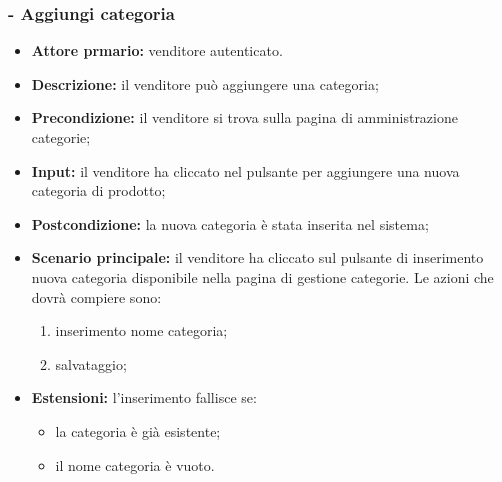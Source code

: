 \stepsubUserCase
\subsubsection{- Aggiungi categoria}
\begin{itemize}
    \item \textbf{Attore prmario:} venditore autenticato.
    \item \textbf{Descrizione:} il venditore può aggiungere una categoria;
    \item \textbf{Precondizione:} il venditore si trova sulla pagina di amministrazione categorie;
    \item \textbf{Input:} il venditore ha cliccato nel pulsante per aggiungere una nuova categoria di prodotto;
    \item \textbf{Postcondizione:} la nuova categoria è stata inserita nel sistema;
    \item \textbf{Scenario principale:} il venditore ha cliccato sul pulsante di inserimento nuova categoria disponibile nella pagina di gestione categorie. Le azioni che dovrà compiere sono:
          \begin{enumerate}
              \item inserimento nome categoria;
              \item salvataggio;
          \end{enumerate}
    \item \textbf{Estensioni:} l'inserimento fallisce se:
          \begin{itemize}
              \item la categoria è già esistente;
              \item il nome categoria è vuoto.
          \end{itemize}
\end{itemize}

\stepsubUserCase
